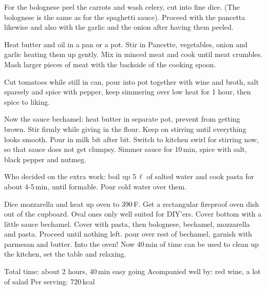\begin{Notes}
  \item For the bolognese peel the carrots and wash celery, cut into fine
    dice. (The bolognese is the same as for the spaghetti sauce). Proceed with
    the pancetta likewise and also with the garlic and the onion after having
    them peeled.
    
  \item Heat butter and oil in a pan or a pot. Stir in Pancette, vegetables,
    onion and garlic heating them up gently. Mix in minced meat and cook until
    meat crumbles. Mash larger pieces of meat with the backside of the cooking
    spoon.
  \item Cut tomatoes while still in can, pour into pot together with wine and
    broth, salt sparsely and spice with pepper, keep simmering over low heat
    for 1 hour, then spice to liking.

  \item Now the sauce bechamel: heat butter in separate pot, prevent from
    getting brown. Stir firmly while giving in the flour. Keep on stirring until
    everything looks smooth. Pour in milk bit after bit. Switch to kitchen swirl
    for stirring now, so that sauce does not get clumpsy. Simmer sauce for
    10\,min, spice with salt, black pepper and nutmeg.
  \item Who decided on the extra work: boil up 5\,$\ell$ of salted water and
    cook pasta for about 4-5\,min, until formable. Pour cold water over them.


  \item Dice mozzarella and heat up oven to 390\textdegree\,F. Get a rectangular
    fireproof oven dish out of the cupboard. Oval ones only well suited for
    DIY'ers. Cover bottom with a little sauce
    bechamel. Cover with pasta, then bolognese, bechamel, mozzarella and pasta.
    Proceed until nothing left. pour over rest of bechamel, garnish with
    parmesan and butter. Into the oven! Now 40\,min of time can be used to clean
    up the kitchen, set the table and relaxing.

\end{Notes}

Total time: about 2 hours, 40\,min easy going \newline
Acompanied well by: red wine, a lot of salad
Per serving: 720\,kcal


